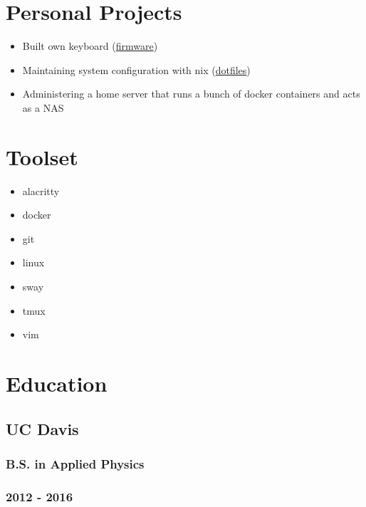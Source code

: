 \documentclass{article}
\begin{document}
\hspace{0.08\textwidth}
\begin{minipage}[t]{.3\textwidth}
\section*{Personal Projects}
\begin{itemize}
    \item Built own keyboard (\href{https://github.com/alejandro-angulo/qmk_firmware/tree/master/keyboards/crkbd/keymaps/alejandro-angulo}{firmware})
    \item Maintaining system configuration with nix (\href{https://github.com/alejandro-angulo/dotfiles/tree/nix-config}{dotfiles})
    \item Administering a home server that runs a bunch of docker containers and acts as a NAS
\end{itemize}
\section*{Toolset}
\begin{itemize}
    \item alacritty
    \item docker
    \item git
    \item linux
    \item sway
    \item tmux
    \item vim
\end{itemize}
\section*{Education}
\subsection*{UC Davis}
\subsubsection*{B.S. in Applied Physics}
\subsubsection*{2012 - 2016}
\end{minipage}
\end{document}
